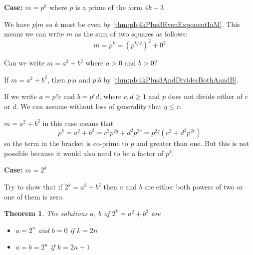 \documentclass[11pt]{amsart}
\newtheorem{theorem}{Theorem}[section]
\begin{document}
\vspace{2em}

\textbf{Case:} $m = p^{k}$ where $p$ is a prime of the form $4k+3$


We have $p | m$ so $k$ must be even by \cref{thm:pIs4kPlus3EvenExponentInM}. This means we can write $m$ as the sum of two squares as follows:
$$
m = p^{k} = \left( p^{k/2} \right)^{2} + 0^{2}
$$

Can we write $m = a^{2} + b^{2}$ where $a>0$ and $b>0$?

If $m = a^{2} + b^{2}$, then $p|a$ and $p|b$ by \cref{thm:pIs4kPlus3AndDividesBothAandB}.

If we write $a = p^{q} c$ and $b = p^{r} d$, where $c,d \ge 1$ and $p$ does not divide either of $c$ or $d$. We can assume without loss of generality that $q \le r$.

$m = a^{2} + b^{2}$ in this case means that
$$
p^{k} = a^{2} + b^{2} = c^{2} p^{2q} + d^{2} p^{2r} = 
p^{2q} \left( c^{2} + d^{2} p^{2r} \right)
$$
so the term in the bracket is co-prime to $p$ and greater than one. But this is not possible because it would also need to be a factor of $p^{k}$.




\vspace{2em}

\textbf{Case:} $m = 2^{k}$ 

Try to show that if $2^{k} = a^{2} + b^{2}$ then $a$ and $b$ are either both powers of two or one of them is zero.

\vspace{2em}

\begin{theorem}
The solutions $a$, $b$ of $2^{k} = a^{2} + b^{2}$ are
\begin{itemize}
\item
$a = 2^{n}$ and $b = 0$ if $k = 2n$
\item
$a = b = 2^{n}$ if $k = 2n + 1$
\end{itemize}
\end{theorem}
\end{document}
